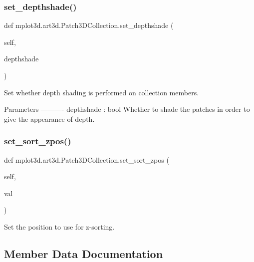 \subsubsection{\texorpdfstring{set\+\_\+depthshade()}{set\_depthshade()}}
{\footnotesize\ttfamily def mplot3d.\+art3d.\+Patch3\+D\+Collection.\+set\+\_\+depthshade (\begin{DoxyParamCaption}\item[{}]{self,  }\item[{}]{depthshade }\end{DoxyParamCaption})}

\begin{DoxyVerb}Set whether depth shading is performed on collection members.

Parameters
----------
depthshade : bool
    Whether to shade the patches in order to give the appearance of
    depth.
\end{DoxyVerb}
 \mbox{\label{classmplot3d_1_1art3d_1_1Patch3DCollection_ae08662e089212e7c0a1e4a4a3fa80174}} 
\subsubsection{\texorpdfstring{set\+\_\+sort\+\_\+zpos()}{set\_sort\_zpos()}}
{\footnotesize\ttfamily def mplot3d.\+art3d.\+Patch3\+D\+Collection.\+set\+\_\+sort\+\_\+zpos (\begin{DoxyParamCaption}\item[{}]{self,  }\item[{}]{val }\end{DoxyParamCaption})}

\begin{DoxyVerb}Set the position to use for z-sorting.\end{DoxyVerb}
 

\subsection{Member Data Documentation}
\mbox{\label{classmplot3d_1_1art3d_1_1Patch3DCollection_a172b65edc885612a09f70dbbceb4e431}} 
